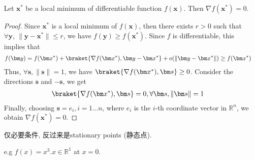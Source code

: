 
\begin{theorem}\label{c2T2}
    Let $\bm x^*$ be a local minimum of differentiable function $f(\bm x)$. Then $\nabla f(\bm x^*)=0$. 
\end{theorem}

\begin{proof}
    Since $\bm x^*$ is a local minimum of $f(\bm x)$, then there exists $r>0$ such that $\forall \bm y$, $\|\bm y-\bm x^*\|\le r$, we have $f(\bm y)\ge f(\bm x^*)$. Since $f$ is differentiable, this implies that 
    \begin{align*}
        f(\bm y)=f(\bm x^*)+\braket{\nabla f(\bm x^*), \bm y-\bm x^*}+o(\|\bm y-\bm x^*\|)\ge f(\bm x^*)
    \end{align*}
    Thus, $\forall \bm s, \|\bm s\|=1$, we have $\braket{\nabla f(\bm x^*), \bm s}\ge 0$. Consider the directions $\bm s$ and $-\bm s$, we get
    \begin{align*}
        \braket{\nabla f(\bm x^*),\bm s}=0, \forall \bm s, \|\bm s\|=1
    \end{align*}
    Finally, choosing $\bm s=e_i,i=1\dots n$, where $e_i$ is the $i$-th coordinate vector in $\mathbb{R}^n$, we obtain $\nabla f(\bm x^*)=0$. 
\end{proof}
仅必要条件, 反过来是stationary points (静态点).

e.g $f(x)=x^3. x\in\mathbb{R}^1$ at $x=0$. 


